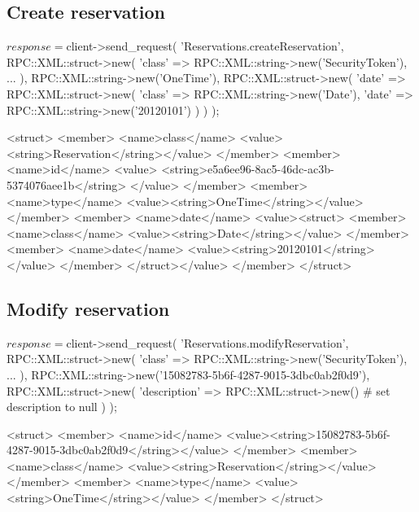 \documentclass[a4paper]{report}
\begin{document}
\subsection{Create reservation}
\begin{PerlCmd}
$response = $client->send_request(
    'Reservations.createReservation',
    RPC::XML::struct->new(
        'class' => RPC::XML::string->new('SecurityToken'),
        ...
    ),
    RPC::XML::string->new('OneTime'),
    RPC::XML::struct->new(
        'date' => RPC::XML::struct->new(
            'class' => RPC::XML::string->new('Date'),
            'date' => RPC::XML::string->new('20120101')
        )
    )
);
\end{PerlCmd}
\begin{PerlResponse}
<struct>
  <member>
    <name>class</name>
    <value><string>Reservation</string></value>
  </member>
  <member>
    <name>id</name>
    <value>
      <string>e5a6ee96-8ac5-46dc-ac3b-5374076aee1b</string>
    </value>
  </member>
  <member>
    <name>type</name>
    <value><string>OneTime</string></value>
  </member>
  <member>
    <name>date</name>
    <value><struct>
        <member>
          <name>class</name>
          <value><string>Date</string></value>
        </member>
        <member>
          <name>date</name>
          <value><string>20120101</string></value>
        </member>
    </struct></value>
  </member>
</struct>
\end{PerlResponse}

\newpage
\subsection{Modify reservation}
\begin{PerlCmd}
$response = $client->send_request(
    'Reservations.modifyReservation',
    RPC::XML::struct->new(
        'class' => RPC::XML::string->new('SecurityToken'),
        ...
    ),
    RPC::XML::string->new('15082783-5b6f-4287-9015-3dbc0ab2f0d9'),
    RPC::XML::struct->new(
        'description' => RPC::XML::struct->new() # set description to null
    )
);
\end{PerlCmd}
\begin{PerlResponse}
<struct>
  <member>
    <name>id</name>
    <value><string>15082783-5b6f-4287-9015-3dbc0ab2f0d9</string></value>
  </member>
  <member>
    <name>class</name>
    <value><string>Reservation</string></value>
  </member>
  <member>
    <name>type</name>
    <value><string>OneTime</string></value>
  </member>
</struct>
\end{PerlResponse}
\end{document}

